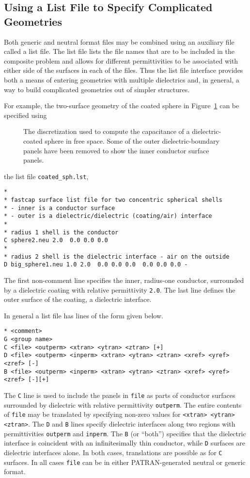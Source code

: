 %
%
\subsection{Using a List File to Specify Complicated Geometries}
\label{listif}

Both generic and neutral format files may be combined using an
auxiliary file called a list file.  The list file lists the file names
that are to be included in the composite problem and allows for
different permittivities to be associated with either side of
the surfaces in each of the files.  Thus the list file interface
provides both a means of entering geometries with multiple dielectrics
and, in general,
a way to build complicated geometries out of simpler structures.

For example, the two-surface geometry of
the coated sphere in Figure~\ref{cut_sph} can be specified using
%
%
\begin{figure}
\centerline{
}
\caption{The discretization used to compute the capacitance of a dielectric-coated sphere in free space.  Some of the outer dielectric-boundary panels
have been removed to show the inner conductor surface
panels.}
\label{cut_sph}
\end{figure}
the list file \verb~coated_sph.lst~,
\begin{verbatim}
*
* fastcap surface list file for two concentric spherical shells
* - inner is a conductor surface
* - outer is a dielectric/dielectric (coating/air) interface
*
* radius 1 shell is the conductor
C sphere2.neu 2.0  0.0 0.0 0.0
*
* radius 2 shell is the dielectric interface - air on the outside
D big_sphere1.neu 1.0 2.0  0.0 0.0 0.0  0.0 0.0 0.0 -
\end{verbatim}
The first non-comment line specifies the inner, radius-one conductor,
surrounded by a dielectric coating with relative permittivity {\tt 2.0}.
The last line defines the outer surface of the coating, a dielectric
interface.  

In general a list file has lines of the form given below. 
{\small
\begin{verbatim}
* <comment>
G <group name>
C <file> <outperm> <xtran> <ytran> <ztran> [+]
D <file> <outperm> <inperm> <xtran> <ytran> <ztran> <xref> <yref> <zref> [-]
B <file> <outperm> <inperm> <xtran> <ytran> <ztran> <xref> <yref> <zref> [-][+]
\end{verbatim}
}
\noindent The {\tt C} line is used to include the panels in {\tt file}
as parts of conductor surfaces surrounded by
dielectric with relative permittivity {\tt outperm}. The entire contents
of {\tt file} may be translated by specifying non-zero values for
{\tt <xtran> <ytran> <ztran>}. The {\tt D} and {\tt B} lines specify
dielectric interfaces along two regions with permittivities {\tt outperm}
and {\tt inperm}. The {\tt B} (or ``both'') specifies that the dielectric
interface is coincident with an infinitesimally thin conductor, while
{\tt D} surfaces are dielectric interfaces alone. In both cases, translations
are possible as for {\tt C} surfaces. In all cases {\tt file} can be
in either PATRAN-generated neutral or generic format.

